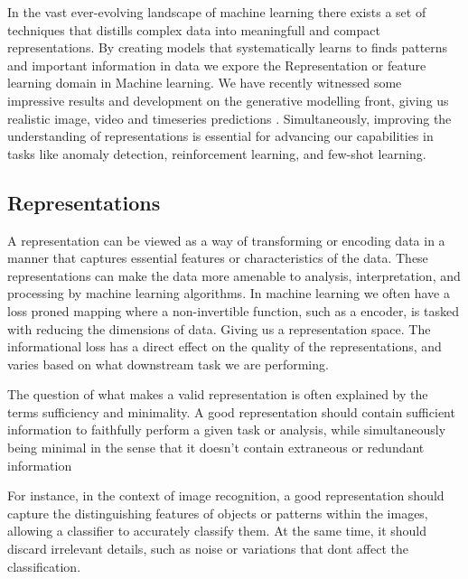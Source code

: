 

In the vast ever-evolving landscape of machine learning there exists a set of techniques that distills complex data into meaningfull and compact representations. 
By creating models that systematically learns to finds patterns and important information in data we expore the Representation or feature learning domain in Machine learning. We have recently witnessed
some impressive results and development on the generative modelling front, giving us realistic image, video and timeseries predictions \cite{lee2023masked}. 
Simultaneously, improving the understanding of representations is essential for advancing our capabilities in tasks like anomaly detection, reinforcement learning, and few-shot learning.




\subsection*{Representations}
A representation can be viewed as a way of transforming or encoding data in a manner that captures essential features or characteristics of the data. 
These representations can make the data more amenable to analysis, interpretation, and processing by machine learning algorithms. In machine learning we often have a loss proned mapping
where a non-invertible function, such as a encoder, is tasked with reducing the dimensions of data. Giving us a representation space. The informational loss has a direct effect on 
the quality of the representations, and varies based on what downstream task we are performing. 

The question of what makes a valid representation is often explained by the terms sufficiency and minimality.
A good representation should contain sufficient information to faithfully perform a given task or analysis, while simultaneously being minimal in the sense that it doesn't contain extraneous or redundant information

For instance, in the context of image recognition, a good representation should capture the distinguishing features of objects or patterns within the images, allowing a classifier to 
accurately classify them. At the same time, it should discard irrelevant details, such as noise or variations that dont affect the classification. 



